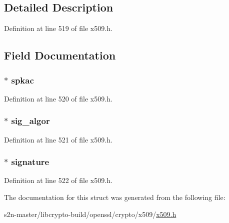 \subsection{Detailed Description}


Definition at line 519 of file x509.\+h.



\subsection{Field Documentation}
\subsubsection[{\texorpdfstring{spkac}{spkac}}]{ $\ast$ spkac}\hypertarget{struct_netscape__spki__st_ad567707ea85f60c35a8d03c22e7d6d0a}{}\label{struct_netscape__spki__st_ad567707ea85f60c35a8d03c22e7d6d0a}


Definition at line 520 of file x509.\+h.

\subsubsection[{\texorpdfstring{sig\+\_\+algor}{sig_algor}}]{ $\ast$ sig\+\_\+algor}\hypertarget{struct_netscape__spki__st_a0ed9821f84b9d73e711b76571c39d58c}{}\label{struct_netscape__spki__st_a0ed9821f84b9d73e711b76571c39d58c}


Definition at line 521 of file x509.\+h.

\subsubsection[{\texorpdfstring{signature}{signature}}]{ $\ast$ signature}\hypertarget{struct_netscape__spki__st_a0ded22400c40848a864a98aeb7946f1a}{}\label{struct_netscape__spki__st_a0ded22400c40848a864a98aeb7946f1a}


Definition at line 522 of file x509.\+h.



The documentation for this struct was generated from the following file\+:\begin{DoxyCompactItemize}
\item 
s2n-\/master/libcrypto-\/build/openssl/crypto/x509/\hyperlink{crypto_2x509_2x509_8h}{x509.\+h}\end{DoxyCompactItemize}
